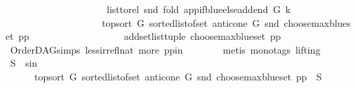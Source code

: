 \begin{isabellebody}
\ \ \ \ \ \ \ \ \ \ \ \ \ \ \ \ \ \ \ \ \ list{\isacharunderscore}{\kern0pt}to{\isacharunderscore}{\kern0pt}rel\ {\isacharparenleft}{\kern0pt}snd\ {\isacharparenleft}{\kern0pt}fold\ {\isacharparenleft}{\kern0pt}app{\isacharunderscore}{\kern0pt}if{\isacharunderscore}{\kern0pt}blue{\isacharunderscore}{\kern0pt}else{\isacharunderscore}{\kern0pt}add{\isacharunderscore}{\kern0pt}end\ G\ k{\isacharparenright}{\kern0pt}\isanewline
\ \ \ \ \ \ \ \ \ \ \ \ \ \ \ \ \ \ \ \ {\isacharparenleft}{\kern0pt}top{\isacharunderscore}{\kern0pt}sort\ G\ {\isacharparenleft}{\kern0pt}sorted{\isacharunderscore}{\kern0pt}list{\isacharunderscore}{\kern0pt}of{\isacharunderscore}{\kern0pt}set\ {\isacharparenleft}{\kern0pt}anticone\ G\ {\isacharparenleft}{\kern0pt}snd\ {\isacharparenleft}{\kern0pt}choose{\isacharunderscore}{\kern0pt}max{\isacharunderscore}{\kern0pt}blue{\isacharunderscore}{\kern0pt}set\ pp{\isacharparenright}{\kern0pt}{\isacharparenright}{\kern0pt}{\isacharparenright}{\kern0pt}{\isacharparenright}{\kern0pt}{\isacharparenright}{\kern0pt}\isanewline
\ \ \ \ \ \ \ \ \ \ \ \ \ \ \ \ \ \ \ {\isacharparenleft}{\kern0pt}add{\isacharunderscore}{\kern0pt}set{\isacharunderscore}{\kern0pt}list{\isacharunderscore}{\kern0pt}tuple\ {\isacharparenleft}{\kern0pt}choose{\isacharunderscore}{\kern0pt}max{\isacharunderscore}{\kern0pt}blue{\isacharunderscore}{\kern0pt}set\ pp{\isacharparenright}{\kern0pt}{\isacharparenright}{\kern0pt}{\isacharparenright}{\kern0pt}{\isacharparenright}{\kern0pt}{\isachardoublequoteclose}\isanewline
\ \ \ \ \ \ \isamarkupfalse%
\ OrderDAG{\isachardot}{\kern0pt}simps\ less{\isacharunderscore}{\kern0pt}irrefl{\isacharunderscore}{\kern0pt}nat\ more\ pp{\isacharunderscore}{\kern0pt}in\isanewline
\ \ \ \ \ \ \isamarkupfalse%
\ {\isacharparenleft}{\kern0pt}metis\ {\isacharparenleft}{\kern0pt}mono{\isacharunderscore}{\kern0pt}tags{\isacharcomma}{\kern0pt}\ lifting{\isacharparenright}{\kern0pt}{\isacharparenright}{\kern0pt}\isanewline
\ \ \ \ \isamarkupfalse%
\ S\ \ s{\isacharunderscore}{\kern0pt}in{\isacharcolon}{\kern0pt}\ \isanewline
\ \ \ \ \ \ {\isachardoublequoteopen}{\isacharparenleft}{\kern0pt}top{\isacharunderscore}{\kern0pt}sort\ G\ {\isacharparenleft}{\kern0pt}sorted{\isacharunderscore}{\kern0pt}list{\isacharunderscore}{\kern0pt}of{\isacharunderscore}{\kern0pt}set\ {\isacharparenleft}{\kern0pt}anticone\ G\ {\isacharparenleft}{\kern0pt}snd\ {\isacharparenleft}{\kern0pt}choose{\isacharunderscore}{\kern0pt}max{\isacharunderscore}{\kern0pt}blue{\isacharunderscore}{\kern0pt}set\ pp{\isacharparenright}{\kern0pt}{\isacharparenright}{\kern0pt}{\isacharparenright}{\kern0pt}{\isacharparenright}{\kern0pt}{\isacharparenright}{\kern0pt}\ {\isacharequal}{\kern0pt}\ S{\isachardoublequoteclose}\ \isamarkupfalse%

\end{isabellebody}
